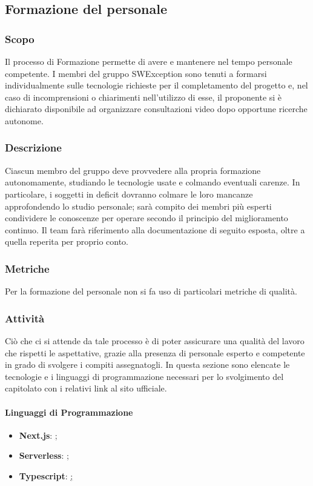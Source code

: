 \subsection{Formazione del personale}
\subsubsection{Scopo}
Il processo di Formazione permette di avere e mantenere nel tempo personale competente. I membri del gruppo SWException sono tenuti a formarsi individualmente sulle tecnologie richieste per il completamento del progetto e, nel caso di incomprensioni o chiarimenti nell'utilizzo di esse, il proponente si è dichiarato disponibile ad organizzare consultazioni video dopo opportune ricerche autonome.
\subsubsection{Descrizione}
Ciascun membro del gruppo deve provvedere alla propria formazione autonomamente,
studiando le tecnologie usate e colmando eventuali carenze. In particolare, i soggetti in
deficit dovranno colmare le loro mancanze approfondendo lo studio personale; sarà compito
dei membri più esperti condividere le conoscenze per operare secondo il principio del miglioramento continuo.
Il team farà riferimento alla documentazione di seguito esposta, oltre a quella reperita per
proprio conto.

\subsubsection{Metriche}
Per la formazione del personale non si fa uso di particolari metriche di qualità.

\subsubsection{Attività}
Ciò che ci si attende da tale processo è di poter assicurare una qualità del lavoro che
rispetti le aspettative, grazie alla presenza di personale esperto e competente in grado di
svolgere i compiti assegnatogli. In questa sezione sono elencate le tecnologie e i linguaggi di programmazione necessari per lo svolgimento del capitolato con i relativi link al sito ufficiale.
\paragraph{Linguaggi di Programmazione}
\begin{itemize}
\item \textbf{Next.js}: \href{https://nextjs.org/};
\item \textbf{Serverless}: \href{https://www.serverless.com/};
\item \textbf{Typescript}: \href{https://www.typescriptlang.org/};
\end{itemize}

